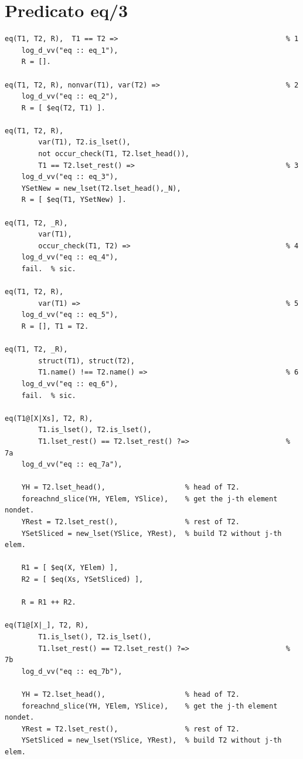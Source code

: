 \documentclass[12pt,a4paper,openright]{book} %
\begin{document}
\section{Predicato eq/3}


\begin{verbatim}
eq(T1, T2, R),  T1 == T2 =>                                        % 1
    log_d_vv("eq :: eq_1"),
    R = [].

eq(T1, T2, R), nonvar(T1), var(T2) =>                              % 2
    log_d_vv("eq :: eq_2"),
    R = [ $eq(T2, T1) ].

eq(T1, T2, R), 
        var(T1), T2.is_lset(),
	    not occur_check(T1, T2.lset_head()),
        T1 == T2.lset_rest() =>                                    % 3
    log_d_vv("eq :: eq_3"),
    YSetNew = new_lset(T2.lset_head(),_N),
    R = [ $eq(T1, YSetNew) ].

eq(T1, T2, _R), 
        var(T1),
        occur_check(T1, T2) =>                                     % 4
    log_d_vv("eq :: eq_4"),
    fail.  % sic.

eq(T1, T2, R), 
        var(T1) =>                                                 % 5
    log_d_vv("eq :: eq_5"),
    R = [], T1 = T2.

eq(T1, T2, _R), 
        struct(T1), struct(T2), 
        T1.name() !== T2.name() =>                                 % 6
    log_d_vv("eq :: eq_6"),
    fail.  % sic.

eq(T1@[X|Xs], T2, R), 
        T1.is_lset(), T2.is_lset(),
        T1.lset_rest() == T2.lset_rest() ?=>                       % 7a
    log_d_vv("eq :: eq_7a"),

    YH = T2.lset_head(),                   % head of T2.
    foreachnd_slice(YH, YElem, YSlice),    % get the j-th element nondet.
    YRest = T2.lset_rest(),                % rest of T2.
    YSetSliced = new_lset(YSlice, YRest),  % build T2 without j-th elem.

    R1 = [ $eq(X, YElem) ],
    R2 = [ $eq(Xs, YSetSliced) ],

    R = R1 ++ R2.

eq(T1@[X|_], T2, R), 
        T1.is_lset(), T2.is_lset(),
        T1.lset_rest() == T2.lset_rest() ?=>                       % 7b
    log_d_vv("eq :: eq_7b"),

    YH = T2.lset_head(),                   % head of T2.
    foreachnd_slice(YH, YElem, YSlice),    % get the j-th element nondet.
    YRest = T2.lset_rest(),                % rest of T2.
    YSetSliced = new_lset(YSlice, YRest),  % build T2 without j-th elem.


\end{verbatim}
\end{document}
